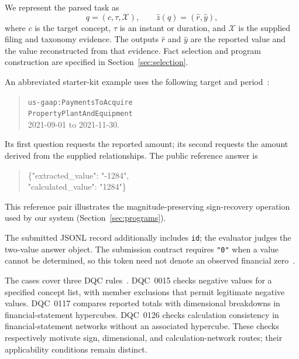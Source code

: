 \documentclass[conference]{IEEEtran}
\begin{document}
We represent the parsed task as
\begin{equation}
q=(c,\tau,\mathcal X), \qquad \hat z(q)=(\hat r,\hat y),
\end{equation}
where $c$ is the target concept, $\tau$ is an instant or duration, and $\mathcal X$ is the supplied filing and taxonomy evidence. The outputs $\hat r$ and $\hat y$ are the reported value and the value reconstructed from that evidence. Fact selection and program construction are specified in Section~\ref{sec:selection}.

An abbreviated starter-kit example uses the following target and period~\cite{task3baseline}:
\begin{quote}
\small\raggedright
\texttt{us-gaap:PaymentsToAcquire}\\
\texttt{PropertyPlantAndEquipment}\\
2021-09-01 to 2021-11-30.
\end{quote}
Its first question requests the reported amount; its second requests the amount derived from the supplied relationships. The public reference answer is
\begin{quote}
\small\ttfamily\raggedright
\{"extracted\_value": "-1284",\\
\phantom{\{}"calculated\_value": "1284"\}
\end{quote}
This reference pair illustrates the magnitude-preserving sign-recovery operation used by our system (Section~\ref{sec:programs}).

The submitted JSONL record additionally includes \texttt{id}; the evaluator judges the two-value answer object. The submission contract requires \texttt{"0"} when a value cannot be determined, so this token need not denote an observed financial zero~\cite{task3submission}.

The cases cover three DQC rules~\cite{dqcusrules}. DQC~0015 checks negative values for a specified concept list, with member exclusions that permit legitimate negative values. DQC~0117 compares reported totals with dimensional breakdowns in financial-statement hypercubes. DQC~0126 checks calculation consistency in financial-statement networks without an associated hypercube. These checks respectively motivate sign, dimensional, and calculation-network routes; their applicability conditions remain distinct.
\end{document}
